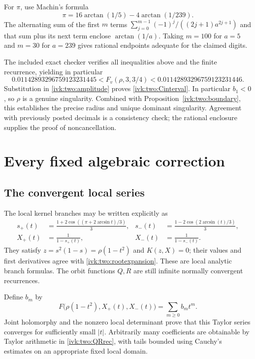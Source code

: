 \documentclass[11pt,letterpaper]{article}
\theoremstyle{remark}\newtheorem{remark}[theorem]{Remark}
\begin{document}
For $\pi$, use Machin's formula
\begin{equation}\label{ivk:two:machin}
 \pi=16\arctan(1/5)-4\arctan(1/239).
\end{equation}
The alternating sum of the first $m$ terms
$\sum_{j=0}^{m-1}(-1)^j/((2j+1)a^{2j+1})$ and that sum plus its next
term enclose $\arctan(1/a)$. Taking $m=100$ for $a=5$ and $m=30$
for $a=239$ gives rational endpoints adequate for the claimed digits.

The included exact checker verifies all inequalities above and the
finite recurrence, yielding in particular
\begin{equation}\label{ivk:two:Fvinterval}
 0.01142893296759123231445
 <F_v(\rho,3,3/4)
 <0.01142893296759123231446.
\end{equation}
Substitution in \eqref{ivk:two:amplitude} proves \eqref{ivk:two:Cinterval}. In
particular $b_1<0$, so $\rho$ is a genuine singularity. Combined with
Proposition~\ref{ivk:two:boundary}, this establishes the precise radius and
unique dominant singularity. Agreement with previously posted decimals
is a consistency check; the rational enclosure supplies the proof of
noncancellation.

\section{Every fixed algebraic correction}
\subsection{The convergent local series}
The local kernel branches may be written explicitly as
\begin{equation}\label{ivk:two:trigbranches}
\begin{aligned}
 s_+(t)&=\frac{1+2\cos((\pi+2\arcsin t)/3)}3,
 &s_-(t)&=\frac{1-2\cos(2\arcsin(t)/3)}3,\\
 X_+(t)&=\frac1{1-s_+(t)},
 &X_-(t)&=\frac1{1-s_-(t)}.
\end{aligned}
\end{equation}
They satisfy $z=s^2(1-s)=\rho(1-t^2)$ and $K(z,X)=0$; their values
and first derivatives agree with \eqref{ivk:two:rootexpansion}. These are
local analytic branch formulas. The orbit functions $Q,R$ are still
infinite normally convergent recurrences.

Define $b_m$ by
\begin{equation}\label{ivk:two:bdef}
 F\bigl(\rho(1-t^2),X_+(t),X_-(t)\bigr)=\sum_{m\ge0}b_mt^m.
\end{equation}
Joint holomorphy and the nonzero local determinant prove that this
Taylor series converges for sufficiently small $|t|$. Arbitrarily
many coefficients are obtainable by Taylor arithmetic in
\eqref{ivk:two:QRrec}, with tails bounded using Cauchy's estimates on an
appropriate fixed local domain.
\end{document}
